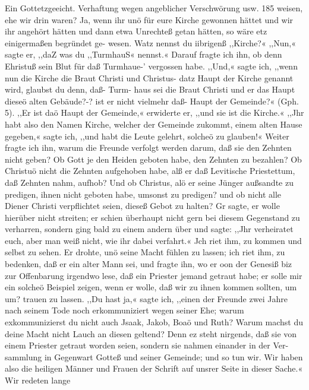 Ein Gottetzgeeicht. Verhaftung wegen angeblicher Verschwörung usw. 185
weisen, ehe wir drin waren? Ja, wenn ihr unö für eure Kirche
gewonnen hättet und wir ihr angehört hätten und dann etwa
Unrechteß getan hätten, so wäre etz einigermaßen begründet ge-
wesen. Watz nennst du iibrigenß ,,Kirche?« ,,Nun,« sagte er,
,,daZ was du ,,TurmhauS« nennst.« Darauf fragte ich ihn, ob
denn Ehristuß sein Blut für daß Turmhaue-’ vergossen habe. ,,Und,«
sagte ich, ,,wenn nun die Kirche die Braut Christi und Christus-
datz Haupt der Kirche genannt wird, glaubst du denn, daß- Turm-
haus sei die Braut Christi und er das Haupt dieseö alten Gebäude?-?
ist er nicht vielmehr daß- Haupt der Gemeinde?« (Gph. 5). ,,Er
ist daö Haupt der Gemeinde,« erwiderte er, ,,und sie ist die
Kirche.« ,,Jhr habt also den Namen Kirche, welcher der Gemeinde
zukommt, einem alten Hause gegeben,« sagte ich, ,,und habt die
Leute gelehrt, solcheö zu glauben!« Weiter fragte ich ihn, warum
die Freunde verfolgt werden darum, daß sie den Zehnten nicht
geben? Ob Gott je den Heiden geboten habe, den Zehnten zu
bezahlen? Ob Christuö nicht die Zehnten aufgehoben habe, alß
er daß Levitische Priestettum, daß Zehnten nahm, aufhob? Und
ob Christus, alö er seine Jünger außsandte zu predigen, ihnen
nicht geboten habe, umsonst zu predigen? und ob nicht alle Diener
Christi verpflichtet seien, dieseß Gebot zu halten? Gr sagte, er
wolle hierüber nicht streiten; er schien überhaupt nicht gern bei
diesem Gegenstand zu verharren, sondern ging bald zu einem
andern über und sagte: ,,Jhr verheiratet euch, aber man weiß
nicht, wie ihr dabei verfahrt.« Jch riet ihm, zu kommen und
selbst zu sehen. Er drohte, unö seine Macht fühlen zu lassen; ich
riet ihm, zu bedenken, daß er ein alter Mann sei, und fragte ihn,
wo er oon der Genesiß biz zur Offenbarung irgendwo lese, daß
ein Priester jemand getraut habe; er solle mir ein solcheö Beispiel
zeigen, wenn er wolle, daß wir zu ihnen kommen sollten, um
um? trauen zu lassen. ,,Du hast ja,« sagte ich, ,,einen der Freunde
zwei Jahre nach seinem Tode noch erkommuniziert wegen seiner
Ehe; warum exkommunizierst du nicht auch Jsaak, Jakob, Boaö und
Ruth? Warum machst du deine Macht nicht Lauch an diesen
geltend? Denn ez steht nirgends, daß sie von einem Priester
getraut worden seien, sondern sie nahmen einander in der Ver-
sammlung in Gegenwart Gotteß und seiner Gemeinde; und so
tun wir. Wir haben also die heiligen Männer und Frauen der
Schrift auf unsrer Seite in dieser Sache.« Wir redeten lange



